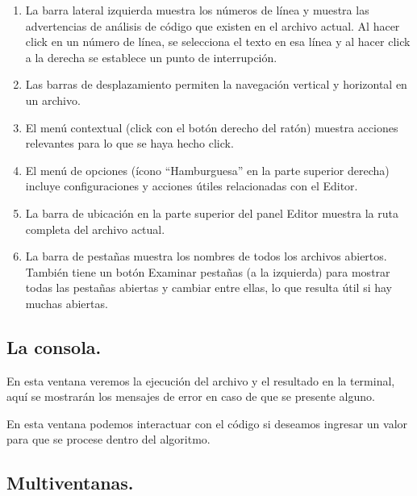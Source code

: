 \begin{enumerate}
\item  La barra lateral izquierda muestra los números de línea y muestra las advertencias de análisis de código que existen en el archivo actual. Al hacer click en un número de línea, se selecciona el texto en esa línea y al hacer click a la derecha se establece un punto de interrupción.
\item Las barras de desplazamiento permiten la navegación vertical y horizontal en un archivo.
\item El menú contextual (click con el botón derecho del ratón) muestra acciones relevantes para lo que se haya hecho click.
\item El menú de opciones (ícono \enquote{Hamburguesa} en la parte superior derecha) incluye configuraciones y acciones útiles relacionadas con el Editor.
\item La barra de ubicación en la parte superior del panel Editor muestra la ruta completa del archivo actual.
\item La barra de pestañas muestra los nombres de todos los archivos abiertos. También tiene un botón Examinar pestañas (a la izquierda) para mostrar todas las pestañas abiertas y cambiar entre ellas, lo que resulta útil si hay muchas abiertas.
\end{enumerate}

\subsection{La consola.}

En esta ventana veremos la ejecución del archivo y el resultado en la terminal, aquí se mostrarán los mensajes de error en caso de que se presente alguno.
\par
En esta ventana podemos interactuar con el código si deseamos ingresar un valor para que se procese dentro del algoritmo.

\subsection{Multiventanas.}

